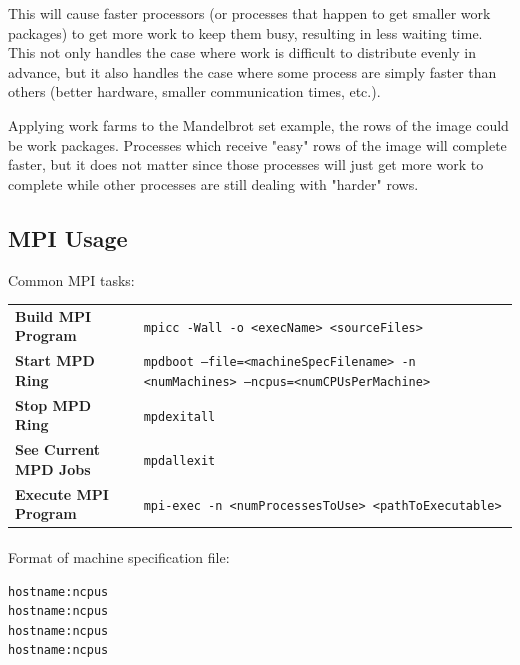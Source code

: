\documentclass{article}
\begin{document}
This will cause faster processors (or processes that happen to get smaller work packages) to get more work to keep them busy, resulting in less waiting time. This not only handles the case where work is difficult to distribute evenly in advance, but it also handles the case where some process are simply faster than others (better hardware, smaller communication times, etc.).

Applying work farms to the Mandelbrot set example, the rows of the image could be work packages. Processes which receive "easy" rows of the image will complete faster, but it does not matter since those processes will just get more work to complete while other processes are still dealing with "harder" rows.

\subsection{MPI Usage}

Common MPI tasks:
\begin{tabular}{lp{10cm}}
	\textbf{Build MPI Program} & \texttt{mpicc -Wall -o <execName> <sourceFiles>} \\
	\textbf{Start MPD Ring} & \texttt{mpdboot --file=<machineSpecFilename> -n <numMachines> --ncpus=<numCPUsPerMachine>} \\
	\textbf{Stop MPD Ring} & \texttt{mpdexitall} \\
	\textbf{See Current MPD Jobs} & \texttt{mpdallexit} \\
	\textbf{Execute MPI Program} & \texttt{mpi-exec -n <numProcessesToUse> <pathToExecutable>} \\
\end{tabular}

\paragraph{}

Format of machine specification file:
\begin{lstlisting}
hostname:ncpus
hostname:ncpus
hostname:ncpus
hostname:ncpus
\end{lstlisting}
\end{document}
